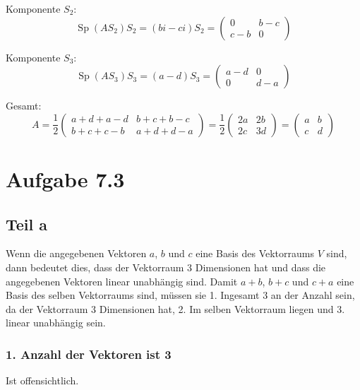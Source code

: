 \documentclass[a4paper,german,12pt,smallheadings]{scrartcl}
\begin{document}
Komponente $S_2$:
\begin{equation*}
  \operatorname{Sp}(AS_2) S_2 = (bi-ci) S_2 = \begin{pmatrix} 0 & b-c \\ c-b & 0 \end{pmatrix}
\end{equation*}

Komponente $S_3$:
\begin{equation*}
  \operatorname{Sp}(AS_3) S_3 = (a-d) S_3 = \begin{pmatrix} a-d & 0 \\ 0 & d-a \end{pmatrix}
\end{equation*}

Gesamt:
\begin{equation*}
  A = \frac{1}{2} \begin{pmatrix} a+d+a-d & b+c+b-c \\ b+c+c-b & a+d+d-a \end{pmatrix}
    = \frac{1}{2} \begin{pmatrix} 2a & 2b \\ 2c & 3d \end{pmatrix}
    = \begin{pmatrix} a & b \\ c & d \end{pmatrix}
\end{equation*}

\section*{Aufgabe 7.3}

\subsection*{Teil a}
Wenn die angegebenen Vektoren $a$, $b$ und $c$ eine Basis des Vektorraums $V$
sind, dann bedeutet dies, dass der Vektorraum 3 Dimensionen hat und dass die
angegebenen Vektoren linear unabhängig sind. Damit $a+b$, $b+c$ und $c+a$ eine
Basis des selben Vektorraums sind, müssen sie 1. Ingesamt 3 an der Anzahl sein,
da der Vektorraum 3 Dimensionen hat, 2. Im selben Vektorraum liegen und 3.
linear unabhängig sein.

\subsubsection*{1. Anzahl der Vektoren ist 3}
Ist offensichtlich.
\end{document}
